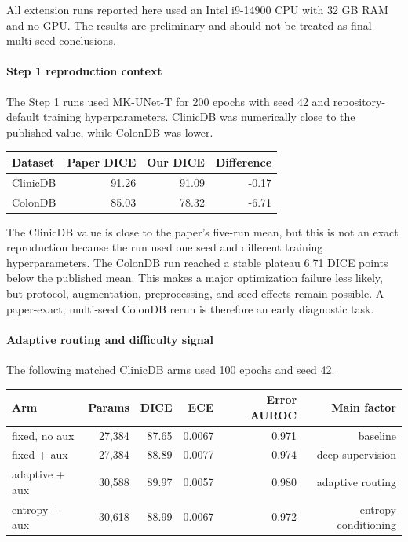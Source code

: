 \documentclass[10pt,a4paper]{article}
\begin{document}
All extension runs reported here used an Intel i9-14900 CPU with 32 GB RAM and no GPU. The results are preliminary and should not be treated as final multi-seed conclusions.

\paragraph{Step 1 reproduction context} The Step 1 runs used MK-UNet-T for 200 epochs with seed 42 and repository-default training hyperparameters. ClinicDB was numerically close to the published value, while ColonDB was lower.

\begin{center}\small
\begin{tabular}{@{}lrrr@{}}
\toprule
Dataset & Paper DICE & Our DICE & Difference \\
\midrule
ClinicDB & 91.26 & 91.09 & -0.17 \\
ColonDB & 85.03 & 78.32 & -6.71 \\
\bottomrule
\end{tabular}
\end{center}

The ClinicDB value is close to the paper's five-run mean, but this is not an exact reproduction because the run used one seed and different training hyperparameters. The ColonDB run reached a stable plateau 6.71 DICE points below the published mean. This makes a major optimization failure less likely, but protocol, augmentation, preprocessing, and seed effects remain possible. A paper-exact, multi-seed ColonDB rerun is therefore an early diagnostic task.

\paragraph{Adaptive routing and difficulty signal} The following matched ClinicDB arms used 100 epochs and seed 42.

\begin{center}\small
\begin{tabular}{@{}lrrrrr@{}}
\toprule
Arm & Params & DICE & ECE & Error AUROC & Main factor \\
\midrule
fixed, no aux & 27{,}384 & 87.65 & 0.0067 & 0.971 & baseline \\
fixed + aux & 27{,}384 & 88.89 & 0.0077 & 0.974 & deep supervision \\
adaptive + aux & 30{,}588 & 89.97 & 0.0057 & 0.980 & adaptive routing \\
entropy + aux & 30{,}618 & 88.99 & 0.0067 & 0.972 & entropy conditioning \\
\bottomrule
\end{tabular}
\end{center}
\end{document}
